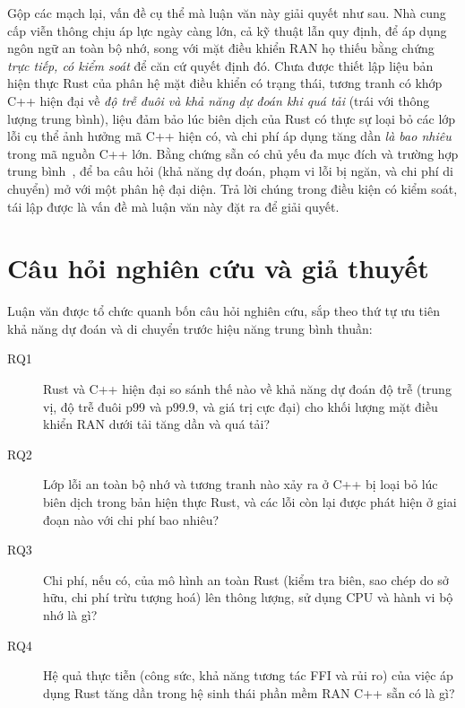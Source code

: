 Gộp các mạch lại, vấn đề cụ thể mà luận văn này giải quyết như sau. Nhà cung cấp viễn thông
chịu áp lực ngày càng lớn, cả kỹ thuật lẫn quy định, để áp dụng ngôn ngữ an toàn bộ nhớ, song
với mặt điều khiển RAN họ thiếu bằng chứng \emph{trực tiếp, có kiểm soát} để căn cứ quyết
định đó. Chưa được thiết lập liệu bản hiện thực Rust của phân hệ mặt điều khiển có trạng thái,
tương tranh có khớp C++ hiện đại về \emph{độ trễ đuôi và khả năng dự đoán khi quá tải} (trái
với thông lượng trung bình), liệu đảm bảo lúc biên dịch của Rust có thực sự loại bỏ các lớp
lỗi cụ thể ảnh hưởng mã C++ hiện có, và chi phí áp dụng tăng dần \emph{là bao nhiêu} trong
mã nguồn C++ lớn. Bằng chứng sẵn có chủ yếu đa mục đích và trường hợp
trung bình~\cite{balasubramanian2017rust,qin2020rust}, để ba câu hỏi (khả năng dự đoán, phạm
vi lỗi bị ngăn, và chi phí di chuyển) mở với một phân hệ đại diện. Trả lời chúng trong điều
kiện có kiểm soát, tái lập được là vấn đề mà luận văn này đặt ra để giải quyết.

\section{Câu hỏi nghiên cứu và giả thuyết}\label{sec:rqs}
Luận văn được tổ chức quanh bốn câu hỏi nghiên cứu, sắp theo thứ tự ưu tiên khả năng dự đoán
và di chuyển trước hiệu năng trung bình thuần:

\begin{description}
  \item[RQ1] Rust và C++ hiện đại so sánh thế nào về khả năng dự đoán độ trễ (trung vị, độ
        trễ đuôi p99 và p99.9, và giá trị cực đại) cho khối lượng mặt điều khiển RAN dưới tải
        tăng dần và quá tải?
  \item[RQ2] Lớp lỗi an toàn bộ nhớ và tương tranh nào xảy ra ở C++ bị loại bỏ lúc biên dịch
        trong bản hiện thực Rust, và các lỗi còn lại được phát hiện ở giai đoạn nào với chi phí
        bao nhiêu?
  \item[RQ3] Chi phí, nếu có, của mô hình an toàn Rust (kiểm tra biên, sao chép do sở hữu, chi
        phí trừu tượng hoá) lên thông lượng, sử dụng CPU và hành vi bộ nhớ là gì?
  \item[RQ4] Hệ quả thực tiễn (công sức, khả năng tương tác FFI và rủi ro) của việc áp dụng
        Rust tăng dần trong hệ sinh thái phần mềm RAN C++ sẵn có là gì?
\end{description}

